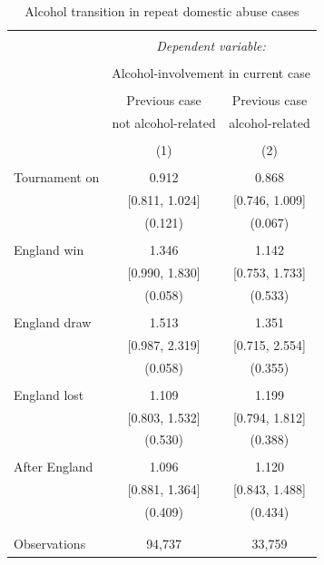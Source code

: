 \documentclass[12pt, a4paper]{article}
\begin{document}
\begin{table}
\centering
 \caption{Alcohol transition in repeat domestic abuse cases}
  \label{alctrans}
  \begin{threeparttable}
\begin{tabular}{@{\extracolsep{5pt}}lcc}
\\[-1.8ex]\hline
\hline \\[-1.8ex]
 & \multicolumn{2}{c}{\textit{Dependent variable:}} \\
\cline{2-3}
\\[-1.8ex] & \multicolumn{2}{c}{Alcohol-involvement in current case} \\
\\[-1.8ex] & Previous case & Previous case\\
& not alcohol-related & alcohol-related\\
\\[-1.8ex] & (1) & (2)\\
\hline \\[-1.8ex]
Tournament on & 0.912 & 0.868 \\
  & [0.811, 1.024] & [0.746, 1.009] \\
  & (0.121) & (0.067) \\
  & & \\
 England win & 1.346 & 1.142 \\
  & [0.990, 1.830] & [0.753, 1.733] \\
  & (0.058) & (0.533) \\
  & & \\
 England draw & 1.513 & 1.351 \\
  & [0.987, 2.319] & [0.715, 2.554] \\
  & (0.058) & (0.355) \\
  & & \\
 England lost & 1.109 & 1.199 \\
  & [0.803, 1.532] & [0.794, 1.812] \\
  & (0.530) & (0.388) \\
  & & \\
 After England & 1.096 & 1.120 \\
  & [0.881, 1.364] & [0.843, 1.488] \\
  & (0.409) & (0.434) \\
  & & \\
\hline \\[-1.8ex]
Observations & 94,737 & 33,759 \\


\end{tabular}
\end{threeparttable}
\end{table}
\end{document}
